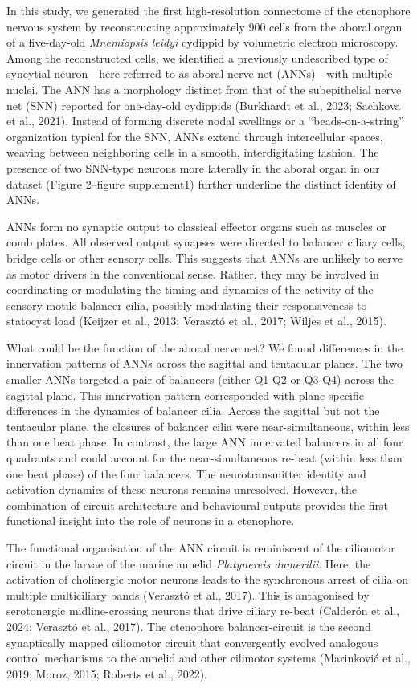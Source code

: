 \documentclass[
  11pt,
]{article}
\begin{document}
In this study, we generated the first high-resolution connectome of the
ctenophore nervous system by reconstructing approximately 900 cells from
the aboral organ of a five-day-old \emph{Mnemiopsis leidyi} cydippid by
volumetric electron microscopy. Among the reconstructed cells, we
identified a previously undescribed type of syncytial neuron---here
referred to as aboral nerve net (ANNs)---with multiple nuclei. The ANN
has a morphology distinct from that of the subepithelial nerve net (SNN)
reported for one-day-old cydippids (Burkhardt et al., 2023; Sachkova et
al., 2021). Instead of forming discrete nodal swellings or a
``beads-on-a-string'' organization typical for the SNN, ANNs extend
through intercellular spaces, weaving between neighboring cells in a
smooth, interdigitating fashion. The presence of two SNN-type neurons
more laterally in the aboral organ in our dataset (Figure 2--figure
supplement1) further underline the distinct identity of ANNs.

ANNs form no synaptic output to classical effector organs such as
muscles or comb plates. All observed output synapses were directed to
balancer ciliary cells, bridge cells or other sensory cells. This
suggests that ANNs are unlikely to serve as motor drivers in the
conventional sense. Rather, they may be involved in coordinating or
modulating the timing and dynamics of the activity of the sensory-motile
balancer cilia, possibly modulating their responsiveness to statocyst
load (Keijzer et al., 2013; Verasztó et al., 2017; Wiljes et al., 2015).

What could be the function of the aboral nerve net? We found differences
in the innervation patterns of ANNs across the sagittal and tentacular
planes. The two smaller ANNs targeted a pair of balancers (either Q1-Q2
or Q3-Q4) across the sagittal plane. This innervation pattern
corresponded with plane-specific differences in the dynamics of balancer
cilia. Across the sagittal but not the tentacular plane, the closures of
balancer cilia were near-simultaneous, within less than one beat phase.
In contrast, the large ANN innervated balancers in all four quadrants
and could account for the near-simultaneous re-beat (within less than
one beat phase) of the four balancers. The neurotransmitter identity and
activation dynamics of these neurons remains unresolved. However, the
combination of circuit architecture and behavioural outputs provides the
first functional insight into the role of neurons in a ctenophore.

The functional organisation of the ANN circuit is reminiscent of the
ciliomotor circuit in the larvae of the marine annelid \emph{Platynereis
dumerilii}. Here, the activation of cholinergic motor neurons leads to
the synchronous arrest of cilia on multiple multiciliary bands (Verasztó
et al., 2017). This is antagonised by serotonergic midline-crossing
neurons that drive ciliary re-beat (Calderón et al., 2024; Verasztó et
al., 2017). The ctenophore balancer-circuit is the second synaptically
mapped ciliomotor circuit that convergently evolved analogous control
mechanisms to the annelid and other cilimotor systems (Marinković et
al., 2019; Moroz, 2015; Roberts et al., 2022).
\end{document}
